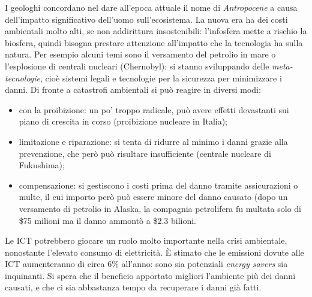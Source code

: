 \documentclass[a4page, 11pt]{article}
\begin{document}
I geologhi concordano nel dare all'epoca attuale il nome di \textit{Antropocene} a causa dell'impatto significativo dell'uomo sull'ecosistema.
La nuova era ha dei costi ambientali  molto alti, se non addirittura insostenibili: l'infosfera mette a rischio la biosfera, quindi bisogna prestare attenzione all'impatto che la tecnologia ha sulla natura.
Per esempio alcuni temi sono il versamento del petrolio in mare o l'esplosione di centrali nucleari (Chernobyl): si stanno sviluppando delle \textit{meta-tecnologie}, cioè  sistemi legali e tecnologie per la sicurezza per minimizzare i danni.
Di fronte a catastrofi ambientali si può reagire in diversi modi:
\begin{itemize}
  \item con la proibizione: un po' troppo radicale, può avere effetti devastanti sui piano di crescita in corso (proibizione nucleare in Italia);
  \item limitazione e riparazione: si tenta di ridurre al minimo i danni grazie alla prevenzione, che però può risultare insufficiente (centrale nucleare di Fukushima);
  \item compensazione: si gestiscono i costi prima del danno tramite assicurazioni o multe, il cui importo però può essere minore del danno causato (dopo un versamento di petrolio in Alaska, la compagnia petrolifera fu multata solo di \$75 milioni ma il danno ammontò a \$2.3 bilioni.
\end{itemize}

Le ICT  potrebbero giocare un ruolo molto importante nella crisi ambientale, nonostante l'elevato consumo di elettricità.
È stimato che le emissioni dovute alle ICT aumenteranno di circa 6\% all'anno:  sono sia potenziali \textit{energy savers} sia inquinanti.
Si spera che il beneficio apportato migliori l'ambiente più dei danni causati, e che ci sia abbastanza tempo da recuperare i danni già fatti.
\end{document}
